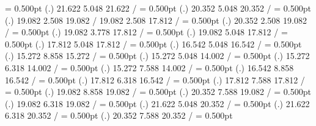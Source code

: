 {%
\linethickness= 0.500pt
\setplotsymbol ({\thinlinefont .})
 21.622  5.048 21.622 /
%
%
\linethickness= 0.500pt
\setplotsymbol ({\thinlinefont .})
 20.352  5.048 20.352 /
%
%
\linethickness= 0.500pt
\setplotsymbol ({\thinlinefont .})
 19.082  2.508 19.082 /
 19.082  2.508 17.812 /
%
%
\linethickness= 0.500pt
\setplotsymbol ({\thinlinefont .})
 20.352  2.508 19.082 /
%
%
\linethickness= 0.500pt
\setplotsymbol ({\thinlinefont .})
 19.082  3.778 17.812 /
%
%
\linethickness= 0.500pt
\setplotsymbol ({\thinlinefont .})
 19.082  5.048 17.812 /
%
%
\linethickness= 0.500pt
\setplotsymbol ({\thinlinefont .})
 17.812  5.048 17.812 /
%
%
\linethickness= 0.500pt
\setplotsymbol ({\thinlinefont .})
 16.542  5.048 16.542 /
%
%
\linethickness= 0.500pt
\setplotsymbol ({\thinlinefont .})
 15.272  8.858 15.272 /
%
%
\linethickness= 0.500pt
\setplotsymbol ({\thinlinefont .})
 15.272  5.048 14.002 /
%
%
\linethickness= 0.500pt
\setplotsymbol ({\thinlinefont .})
 15.272  6.318 14.002 /
%
%
\linethickness= 0.500pt
\setplotsymbol ({\thinlinefont .})
 15.272  7.588 14.002 /
%
%
\linethickness= 0.500pt
\setplotsymbol ({\thinlinefont .})
 16.542  8.858 16.542 /
%
%
\linethickness= 0.500pt
\setplotsymbol ({\thinlinefont .})
 17.812  6.318 16.542 /
%
%
\linethickness= 0.500pt
\setplotsymbol ({\thinlinefont .})
 17.812  7.588 17.812 /
%
%
\linethickness= 0.500pt
\setplotsymbol ({\thinlinefont .})
 19.082  8.858 19.082 /
%
%
\linethickness= 0.500pt
\setplotsymbol ({\thinlinefont .})
 20.352  7.588 19.082 /
%
%
\linethickness= 0.500pt
\setplotsymbol ({\thinlinefont .})
 19.082  6.318 19.082 /
%
%
\linethickness= 0.500pt
\setplotsymbol ({\thinlinefont .})
 21.622  5.048 20.352 /
%
%
\linethickness= 0.500pt
\setplotsymbol ({\thinlinefont .})
 21.622  6.318 20.352 /
%
%
\linethickness= 0.500pt
\setplotsymbol ({\thinlinefont .})
 20.352  7.588 20.352 /
%
%
\linethickness= 0.500pt
}

